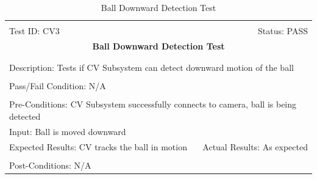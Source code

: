 \documentclass[11pt]{article}
\begin{document}
\begin{center}
\begin{table}[H]
\begin{tabular}{|l r|}\hline&\\[-2mm]
	Test ID: CV3	&Status: PASS\\[-3mm]
	\multicolumn{2}{|c|}{\textbf{\large{Ball Downward Detection Test}}}\\&\\\hline&\\[-3mm]
	\multicolumn{2}{|p{\textwidth}|}{Description: Tests if CV Subsystem can detect downward motion of the ball}\\[1mm]\hline&\\[-3mm]
	\multicolumn{2}{|p{\textwidth}|}{Pass/Fail Condition: N/A }\\[1mm]\hline&\\[-3mm]
	\multicolumn{2}{|p{\textwidth}|}{Pre-Conditions: CV Subsystem successfully connects to camera, ball is being detected}\\[4mm]
	\multicolumn{2}{|p{\textwidth}|}{Input: Ball is moved downward}\\[2mm]\hline
	\multicolumn{1}{|p{0.49\textwidth}}{Expected Results: CV tracks the ball in motion}	&\multicolumn{1}{|p{0.45\textwidth}|}{Actual Results: As expected}\\\hline&\\[-3mm]
	\multicolumn{2}{|p{\textwidth}|}{Post-Conditions: N/A}\\\hline
\end{tabular}
\caption{Ball Downward Detection Test}
\end{table}
\end{center}
\end{document}
